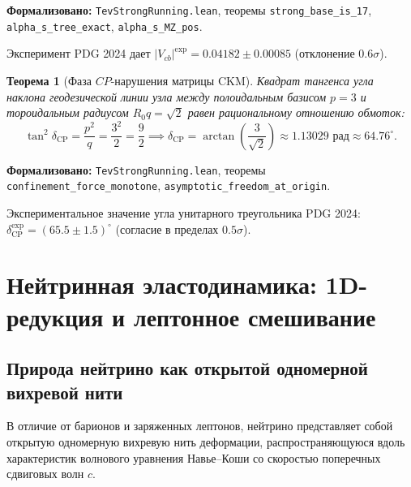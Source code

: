 \documentclass[11pt,a4paper]{article}
\newtheorem{theorem}{Теорема}
\theoremstyle{definition}
\theoremstyle{remark}
\begin{document}
\noindent\small\textbf{Формализовано:} \texttt{TevStrongRunning.lean}, теоремы \texttt{strong_base_is_17}, \texttt{alpha_s_tree_exact}, \texttt{alpha_s_MZ_pos}.

Эксперимент PDG 2024 дает $|V_{cb}|^{\mathrm{exp}} = 0.04182 \pm 0.00085$ (отклонение $0.6\sigma$).

\begin{theorem}[Фаза $CP$-нарушения матрицы CKM]
\label{thm:delta_cp_exact}
Квадрат тангенса угла наклона геодезической линии узла между полоидальным базисом $p=3$ и тороидальным радиусом $R_0 q = \sqrt{2}$ равен рациональному отношению обмоток:
\begin{equation}
	\tan^2\delta_{\mathrm{CP}} = \frac{p^2}{q} = \frac{3^2}{2} = \frac{9}{2} \implies \delta_{\mathrm{CP}} = \arctan\left(\frac{3}{\sqrt{2}}\right) \approx 1.13029\text{ рад} \approx 64.76^\circ.
\label{eq:delta_cp_exact}
\end{equation}
\end{theorem}

\noindent\small\textbf{Формализовано:} \texttt{TevStrongRunning.lean}, теоремы \texttt{confinement_force_monotone}, \texttt{asymptotic_freedom_at_origin}.

Экспериментальное значение угла унитарного треугольника PDG 2024: $\delta_{\mathrm{CP}}^{\mathrm{exp}} = (65.5 \pm 1.5)^\circ$ (согласие в пределах $0.5\sigma$).

\section{Нейтринная эластодинамика: 1D-редукция и лептонное смешивание}
	
\subsection{Природа нейтрино как открытой одномерной вихревой нити}
	
В отличие от барионов и заряженных лептонов, нейтрино представляет собой открытую одномерную вихревую нить деформации, распространяющуюся вдоль характеристик волнового уравнения Навье--Коши со скоростью поперечных сдвиговых волн $c$.
	
\end{document}
